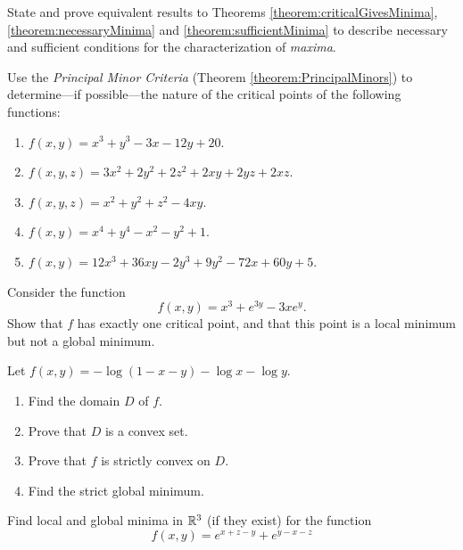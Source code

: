 
\begin{problem}[Advanced]
State and prove equivalent results to Theorems \ref{theorem:criticalGivesMinima}, \ref{theorem:necessaryMinima} and \ref{theorem:sufficientMinima} to describe necessary and sufficient conditions for the characterization of \emph{maxima}.
\end{problem}

\begin{problem}[Basic]\cite[p.32, \#7]{peressini1988mathematics}
Use the \emph{Principal Minor Criteria} (Theorem \ref{theorem:PrincipalMinors}) to determine---if possible---the nature of the critical points of the following functions:
\begin{enumerate}
	\item $f(x,y) = x^3+y^3-3x-12y+20$.
	\item $f(x,y,z) = 3x^2+2y^2+2z^2+2xy+2yz+2xz$.
	\item $f(x,y,z) = x^2+y^2+z^2-4xy$.
	\item $f(x,y) = x^4+y^4-x^2-y^2+1$.
	\item $f(x,y) = 12x^3+36xy-2y^3+9y^2-72x+60y+5$.
\end{enumerate}
\end{problem}


\begin{problem}[Intermediate]\cite[p.36 \#33]{peressini1988mathematics}
Consider the function
\begin{equation*}
f(x,y) = x^3 + e^{3y} -3xe^y.
\end{equation*}
Show that $f$ has exactly one critical point, and that this point is a local minimum but not a global minimum.
\end{problem}

\begin{problem}[Basic]
Let $f(x,y) = -\log(1-x-y)-\log x -\log y$.
\begin{enumerate}
	\item Find the domain $D$ of $f$.
	\item Prove that $D$ is a convex set.
	\item Prove that $f$ is strictly convex on $D$.
	\item Find the strict global minimum.
\end{enumerate}
\end{problem}

\begin{problem}[Basic]\cite[p.81 \#27]{peressini1988mathematics}
Find local and global minima in $\mathbb{R}^3$ (if they exist) for the function 
\begin{equation*}
f(x,y) = e^{x+z-y}+e^{y-x-z}
\end{equation*}
\end{problem}

